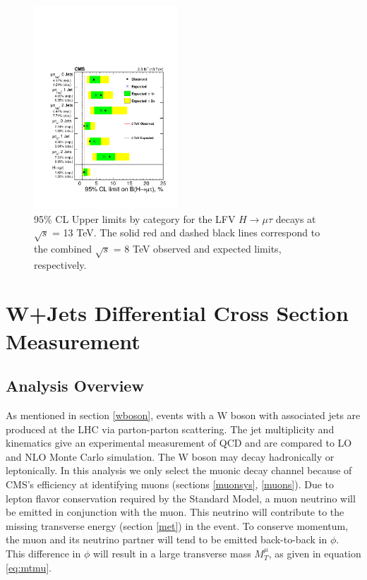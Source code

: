 \documentclass[oneside, letterpaper, oldfontcommands]{memoir}
\begin{document}
\begin{figure}[hbtp]\centering
\includegraphics[width=0.48\textwidth]{13TeVLimits.pdf}
 \caption{95\% CL Upper limits by category for the LFV $H \rightarrow \mu \tau$  decays at $\sqrt{s}$ = 13 TeV. The solid red and dashed black lines correspond to the combined $\sqrt{s}$ = 8 TeV observed and expected limits, respectively.}
 \label{fig:limits_summary13TeV}\end{figure}



\chapter{W+Jets Differential Cross Section Measurement}\label{wjets}

\section{Analysis Overview}

\qquad As mentioned in section \ref{wboson}, events with a W boson with associated jets are produced at the LHC via parton-parton scattering. The jet multiplicity and kinematics give an experimental measurement of QCD and are compared to LO and NLO Monte Carlo simulation. The W boson may decay hadronically or leptonically. In this analysis we only select the muonic decay channel because of CMS's efficiency at identifying muons (sections \ref{muonsys}, \ref{muons}). Due to lepton flavor conservation required by the Standard Model, a muon neutrino will be emitted in conjunction with the muon. This neutrino will contribute to the missing transverse energy (section \ref{met}) in the event. To conserve momentum, the muon and its neutrino partner will tend to be emitted back-to-back in $\phi$. This difference in $\phi$ will result in a large transverse mass $M_{T}^{\mu}$, as given in equation \ref{eq:mtmu}. 
\end{document}
